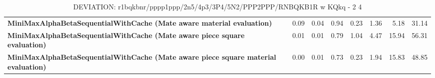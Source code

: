 \begin{table}[H]
{\begin{tabular}{|p{8cm}|*{7}{r|}}
            \rowcolor[HTML]{EFEFEF}
            \textbf{MiniMaxAlphaBetaSequentialWithCache (Mate aware material evaluation)}              & 0.09 & 0.04 & 0.94 & 0.23 & 1.36 & 5.18 & 31.14 \\
            \rowcolor[HTML]{FFFFFF}
            \textbf{MiniMaxAlphaBetaSequentialWithCache (Mate aware piece square evaluation)}               & 0.01 & 0.01 & 0.79 & 1.04 & 4.47 & 15.94 & 56.31 \\
            \rowcolor[HTML]{EFEFEF}
            \textbf{MiniMaxAlphaBetaSequentialWithCache (Mate aware piece square material evaluation)}               & 0.00 & 0.01 & 0.73 & 0.23 & 1.94 & 15.83 & 48.85 \\

            \hline
        \end{tabular}%
    }
    \caption{DEVIATION: r1bqkbnr/pppp1ppp/2n5/4p3/3P4/5N2/PPP2PPP/RNBQKB1R w KQkq - 2 4}
    \label{tab:fork-opportunity-deviation}
\end{table}
